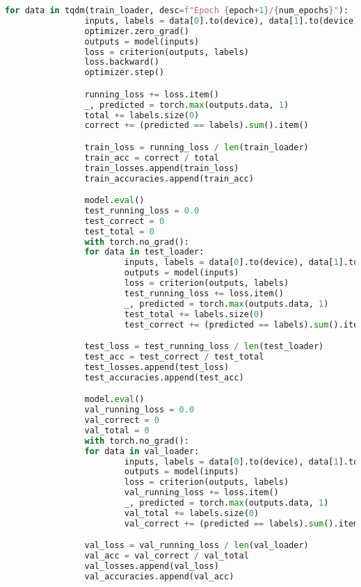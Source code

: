 \begin{lstlisting}[language=Python, caption={Python skript použitý na trenovanie modelu}, label={lst:training}]
        for data in tqdm(train_loader, desc=f"Epoch {epoch+1}/{num_epochs}"):
                inputs, labels = data[0].to(device), data[1].to(device)
                optimizer.zero_grad()
                outputs = model(inputs)
                loss = criterion(outputs, labels)
                loss.backward()
                optimizer.step()

                running_loss += loss.item()
                _, predicted = torch.max(outputs.data, 1)
                total += labels.size(0)
                correct += (predicted == labels).sum().item()

                train_loss = running_loss / len(train_loader)
                train_acc = correct / total
                train_losses.append(train_loss)
                train_accuracies.append(train_acc)

                model.eval()
                test_running_loss = 0.0
                test_correct = 0
                test_total = 0
                with torch.no_grad():
                for data in test_loader:
                        inputs, labels = data[0].to(device), data[1].to(device)
                        outputs = model(inputs)
                        loss = criterion(outputs, labels)
                        test_running_loss += loss.item()
                        _, predicted = torch.max(outputs.data, 1)
                        test_total += labels.size(0)
                        test_correct += (predicted == labels).sum().item()

                test_loss = test_running_loss / len(test_loader)
                test_acc = test_correct / test_total
                test_losses.append(test_loss)
                test_accuracies.append(test_acc)

                model.eval()
                val_running_loss = 0.0
                val_correct = 0
                val_total = 0
                with torch.no_grad():
                for data in val_loader:
                        inputs, labels = data[0].to(device), data[1].to(device)
                        outputs = model(inputs)
                        loss = criterion(outputs, labels)
                        val_running_loss += loss.item()
                        _, predicted = torch.max(outputs.data, 1)
                        val_total += labels.size(0)
                        val_correct += (predicted == labels).sum().item()

                val_loss = val_running_loss / len(val_loader)
                val_acc = val_correct / val_total
                val_losses.append(val_loss)
                val_accuracies.append(val_acc)


\end{lstlisting}
